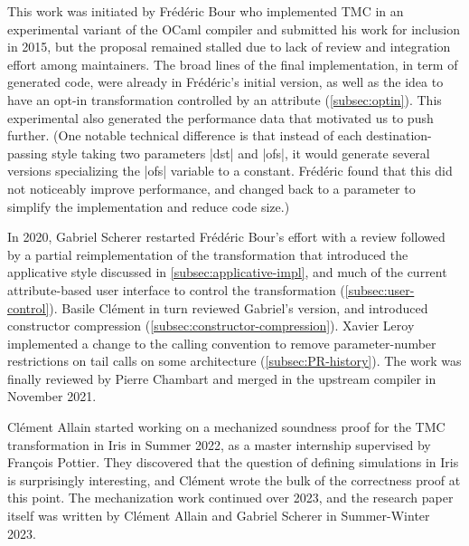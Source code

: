 \begin{acks}
  This work was initiated by Frédéric Bour who implemented TMC in an
  experimental variant of the OCaml compiler and submitted his work
  for inclusion in 2015, but the proposal remained stalled due to lack
  of review and integration effort among maintainers. The broad lines
  of the final implementation, in term of generated code, were already
  in Frédéric's initial version, as well as the idea to have an opt-in
  transformation controlled by an attribute
  (\cref{subsec:optin}). This experimental also generated the
  performance data that motivated us to push further. (One notable
  technical difference is that instead of each destination-passing
  style taking two parameters \ocaml|dst| and |ofs|, it would generate
  several versions specializing the \ocaml|ofs| variable to
  a constant. Frédéric found that this did not noticeably improve
  performance, and changed back to a parameter to simplify the
  implementation and reduce code size.)
  
  In 2020, Gabriel Scherer restarted Frédéric Bour's effort with
  a review followed by a partial reimplementation of the
  transformation that introduced the applicative style discussed in
  \cref{subsec:applicative-impl}, and much of the current
  attribute-based user interface to control the transformation
  (\cref{subsec:user-control}). Basile Clément in turn reviewed
  Gabriel's version, and introduced constructor compression
  (\cref{subsec:constructor-compression}). Xavier Leroy implemented
  a change to the \OCaml calling convention to remove parameter-number
  restrictions on tail calls on some architecture
  (\cref{subsec:PR-history}). The work was finally reviewed by Pierre
  Chambart and merged in the upstream \OCaml compiler in November
  2021.

  Clément Allain started working on a mechanized soundness proof for
  the TMC transformation in Iris in Summer 2022, as a master
  internship supervised by François Pottier. They discovered that the
  question of defining simulations in Iris is surprisingly
  interesting, and Clément wrote the bulk of the correctness proof at
  this point. The mechanization work continued over 2023, and the
  research paper itself was written by Clément Allain and Gabriel
  Scherer in Summer-Winter 2023.

\end{acks}

